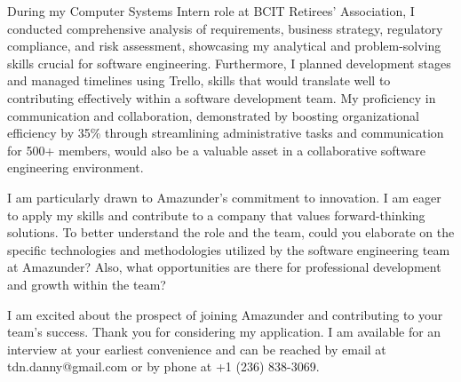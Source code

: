 \documentclass[letterpaper,11pt]{article}
\begin{document}
During my Computer Systems Intern role at BCIT Retirees' Association, I conducted comprehensive analysis of requirements, business strategy, regulatory compliance, and risk assessment, showcasing my analytical and problem-solving skills crucial for software engineering. Furthermore, I planned development stages and managed timelines using Trello, skills that would translate well to contributing effectively within a software development team. My proficiency in communication and collaboration, demonstrated by boosting organizational efficiency by 35\% through streamlining administrative tasks and communication for 500+ members, would also be a valuable asset in a collaborative software engineering environment.

\vspace{10pt}

I am particularly drawn to Amazunder's commitment to innovation. I am eager to apply my skills and contribute to a company that values forward-thinking solutions. To better understand the role and the team, could you elaborate on the specific technologies and methodologies utilized by the software engineering team at Amazunder? Also, what opportunities are there for professional development and growth within the team?

\vspace{10pt}

I am excited about the prospect of joining Amazunder and contributing to your team's success. Thank you for considering my application. I am available for an interview at your earliest convenience and can be reached by email at tdn.danny@gmail.com or by phone at +1 (236) 838-3069.
\end{document}
